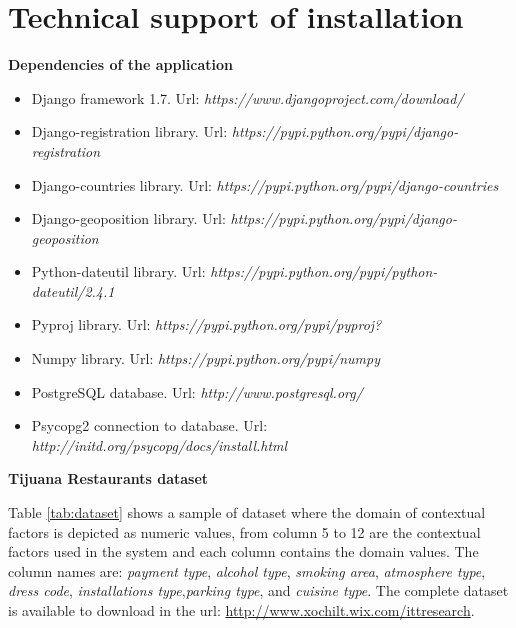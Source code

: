 \chapter{Technical support of installation}\label{apendixc}
\begin{singlespace}
\textbf{\large{Dependencies of the application}}
\begin{itemize}
\item Django framework 1.7. Url: \textit{https://www.djangoproject.com/download/}
\item Django-registration library. Url: \textit{https://pypi.python.org/pypi/django-registration}
\item Django-countries library. Url: \textit{https://pypi.python.org/pypi/django-countries}
\item Django-geoposition library. Url: \textit{https://pypi.python.org/pypi/django-geoposition}
\item Python-dateutil library. Url: \textit{https://pypi.python.org/pypi/python-dateutil/2.4.1}
\item Pyproj library. Url: \textit{https://pypi.python.org/pypi/pyproj?}
\item Numpy library. Url: \textit{https://pypi.python.org/pypi/numpy}
\item PostgreSQL database. Url: \textit{http://www.postgresql.org/}
\item Psycopg2 connection to database. Url: \textit{http://initd.org/psycopg/docs/install.html}
\end{itemize}
\end{singlespace}

\textbf{\large{Tijuana Restaurants dataset}}

Table \ref{tab:dataset} shows a sample of dataset  where the domain
of contextual factors  is depicted as numeric values, from column 5 to
12  are the contextual factors used in the system and each column
contains the domain values.  The column names are: \textit{payment
type}, \textit{alcohol type}, \textit{smoking area},
\textit{atmosphere type}, \textit{dress code}, \textit{installations
type},\textit{parking type}, and \textit{cuisine type}.
The complete dataset is available to download in the url: 
\url{http://www.xochilt.wix.com/ittresearch}.

